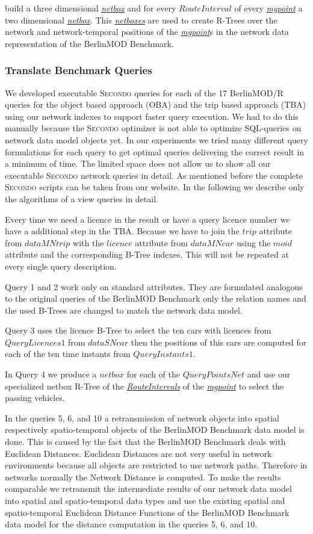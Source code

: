 \documentclass[a4paper]{article}
\newcommand{\secondo}{\textsc{Secondo}}
\newcommand{\bmodb} {BerlinMOD Benchmark}
\newcommand{\dt}[1]{\textsl{\underline{#1}}}
\begin{document}
build a three dimensional \dt{netbox} and for every $RouteInterval$ of every
\dt{mgpoint} a two dimensional \dt{netbox}. This \dt{netboxes} are used to
create R-Trees over the network and network-temporal positions of the \dt{mgpoint}s
in the network data representation of the \bmodb{}.

\subsubsection{Translate Benchmark Queries}
\label{sec:queries}
We developed executable \secondo{} queries for each of the 17 BerlinMOD/R queries
for the object based approach (OBA) and the trip based approach (TBA) using our
network indexes to support faster query execution. We had to do this manually
because the \secondo{} optimizer  is not able to optimize SQL-queries on network
data model objects yet. In our experiments we tried many different query
formulations for each query to get optimal queries delivering the correct result
in a minimum of time. The limited space does not allow us to show all our
executable \secondo{} network queries in detail. As mentioned before the complete
\secondo{} scripts can be taken from our website. In the following we describe
only the algorithms of a view queries in detail.

Every time we need a licence in the result or have a query licence number we have
a additional step in the TBA. Because we have to join the $trip$ attribute from
$dataMNtrip$ with the $licence$ attribute from $dataMNcar$ using the $moid$ attribute
and the corresponding B-Tree indexes. This will not be repeated at every single
query description.

Query 1 and 2 work only on standard attributes. They are formulated analogous to
 the original queries of the \bmodb{} only the relation names and the used B-Trees
are changed to match the network data model.

Query 3 uses the licence B-Tree to select the ten cars with licences from
 $QueryLicences1$  from $dataSNcar$ then the positions of this cars are computed
for each of the ten time instants from $QueryInstants1$.

In Query 4 we produce a $netbox$ for each of the $QueryPointsNet$ and use our
 specialized netbox R-Tree of the \dt{RouteIntervals} of the \dt{mgpoint} to select
 the passing vehicles.

In the queries 5, 6, and 10 a retransmission of network objects into spatial
 respectively spatio-temporal objects of the \bmodb{} data model is done. This is
 caused by the fact that
the \bmodb{} deals with Euclidean Distances. Euclidean Distances are not very useful
 in network environments because all objects are restricted to use network paths.
 Therefore in networks normally the Network Distance is computed. To make the results
 comparable we retransmit the intermediate results of our network data model into
 spatial and spatio-temporal data types and use the existing spatial and
spatio-temporal Euclidean Distance Functions of the \bmodb{} data model for the
 distance computation in the queries 5, 6, and 10.
\end{document}
